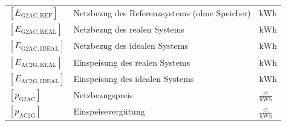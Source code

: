 \vspace{0.1cm}

\renewcommand{\arraystretch}{1.2}
\begin{tabular}{@{} l p{6.5cm} l @{}}
    $[E_{\mathrm{G2AC,REF}}]$   & Netzbezug des Referenzsystems (ohne Speicher) \dotfill & $\mathrm{kWh}$ \\
    $[E_{\mathrm{G2AC,REAL}}]$  & Netzbezug des realen Systems \dotfill & $\mathrm{kWh}$ \\
    $[E_{\mathrm{G2AC,IDEAL}}]$ & Netzbezug des idealen Systems \dotfill & $\mathrm{kWh}$ \\
    $[E_{\mathrm{AC2G,REAL}}]$  & Einspeisung des realen Systems \dotfill & $\mathrm{kWh}$ \\
    $[E_{\mathrm{AC2G,IDEAL}}]$ & Einspeisung des idealen Systems \dotfill & $\mathrm{kWh}$ \\
    $[p_{\mathrm{G2AC}}]$       & Netzbezugspreis \dotfill & $\frac{\mathrm{ct}}{\mathrm{kWh}}$ \\
    $[p_{\mathrm{AC2G}}]$       & Einspeisevergütung \dotfill & $\frac{\mathrm{ct}}{\mathrm{kWh}}$ \\
\end{tabular}

